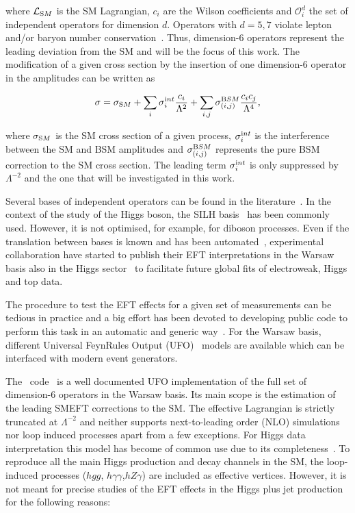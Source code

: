 where $\mathcal{L}_{\textrm SM}$ is the SM Lagrangian, $c_i$ are the Wilson coefficients and ${\mathcal{O}^{d}_i}$ the set of independent operators for dimension $d$. Operators with $d=5,7$  violate lepton and/or baryon number conservation~\cite{Degrande:2012wf,Kobach:2016ami}. Thus, dimension-6 operators represent the leading deviation from the SM and will be the focus of this work. The modification of a given cross section by the insertion of one dimension-6 operator in the amplitudes can be written as

\begin{equation}
\sigma = \sigma_{\textrm SM} + \sum_{i}\sigma_i^{\textrm int} \frac{c_i}{\Lambda^{2}} + \sum_{i,j}\sigma_{(i,j)}^{\textrm BSM} \frac{c_ic_j}{\Lambda^{4}},
\end{equation}  

where $\sigma_{\textrm SM}$ is the SM cross section of a given process, $\sigma_i^{\textrm int}$ is the interference between the SM and BSM amplitudes and $\sigma_{(i,j)}^{\textrm BSM}$ represents the pure BSM correction to the SM cross section. The leading term $\sigma_i^{\textrm int}$ is only suppressed by $\Lambda^{-2}$ and the one that will be investigated in this work. 

Several bases of independent operators can be found in the literature~\cite{Grzadkowski:2010es,Contino:2013kra,Gupta:2014rxa,Masso:2014xra}. In the context of the study of the Higgs boson, the SILH basis~\cite{Contino:2013kra} has been commonly used. However, it is not optimised, for example, for diboson processes. Even if the translation between bases is known and has been automated~\cite{Falkowski:2015wza,Aebischer:2017ugx}, experimental collaboration have started to publish their EFT interpretations in the Warsaw basis also in the Higgs sector~\cite{ATLAS:2019jst,ATL-PHYS-PUB-2019-042} to facilitate future global fits of electroweak, Higgs and top data.

The procedure to test the EFT effects for a given set of measurements can be tedious in practice and a big effort has been devoted to developing public code to perform this task in an automatic and generic way~\cite{Brivio:2019irc}. For the Warsaw basis, different Universal FeynRules Output (UFO)~\cite{Degrande:2011ua} models are available which can be interfaced with modern event generators.

The \SMEFTsim\ code~\cite{Brivio:2017btx} is a well documented UFO implementation of the full set of dimension-6 operators in the Warsaw basis. Its main scope is the estimation of the leading SMEFT corrections to the SM. The effective Lagrangian is strictly truncated at $\Lambda^{-2}$ and neither supports next-to-leading order (NLO) simulations nor loop induced processes apart from a few exceptions. For Higgs data interpretation this model has become of common use due to its completeness~\cite{Ellis:2018gqa,Falkowski:2019hvp,ATLAS:2019jst}.  To reproduce all the main Higgs production and decay channels in the SM, the loop-induced processes ($hgg$, $h\gamma\gamma$,$hZ\gamma$) are included as effective vertices. However, it is not meant for precise studies of the EFT effects in the Higgs plus jet production for the following reasons:

